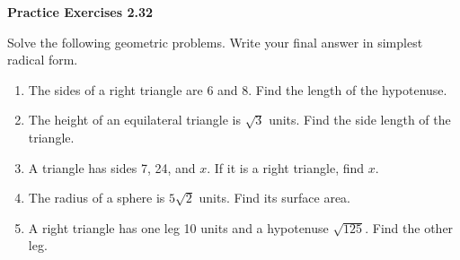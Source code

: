 \vspace{0.3ex}
\noindent\textbf{Practice Exercises 2.32}

\vspace{0.2ex}


Solve the following geometric problems. Write your final answer in simplest radical form.

\begin{enumerate}[label=\color{blue}\arabic*.]

    \item The sides of a right triangle are 6 and 8. Find the length of the hypotenuse.
    \item The height of an equilateral triangle is \( \sqrt{3} \) units. Find the side length of the triangle.
    \item A triangle has sides 7, 24, and \( x \). If it is a right triangle, find \( x \).
    \item The radius of a sphere is \( 5\sqrt{2} \) units. Find its surface area.
    \item A right triangle has one leg 10 units and a hypotenuse \( \sqrt{125} \). Find the other leg.
    
\end{enumerate}
